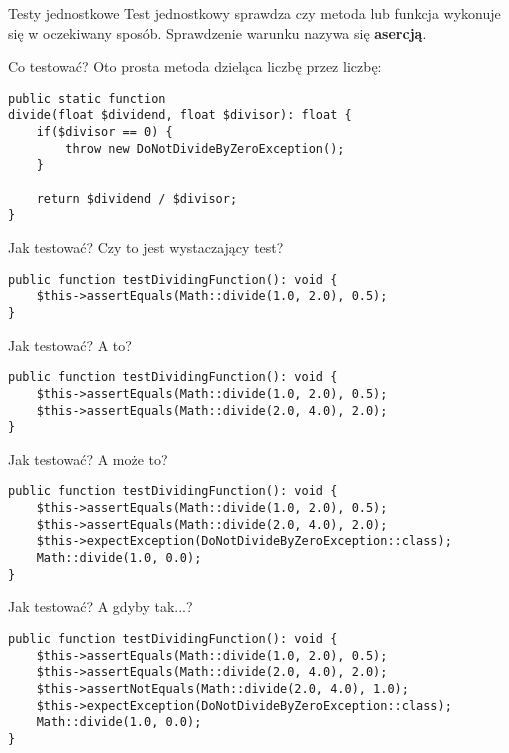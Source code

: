\begin{frame}{Testy jednostkowe}
	Test jednostkowy sprawdza czy metoda lub funkcja wykonuje się w oczekiwany sposób. Sprawdzenie warunku nazywa się \textbf{asercją}.
\end{frame}

\begin{frame}[fragile]{Co testować?}
	Oto prosta metoda dzieląca liczbę przez liczbę:

\begin{lstlisting}
public static function
divide(float $dividend, float $divisor): float {
    if($divisor == 0) {
        throw new DoNotDivideByZeroException();
    }
    
    return $dividend / $divisor;
}
\end{lstlisting}
\end{frame}

\begin{frame}[fragile]{Jak testować?}
	Czy to jest wystaczający test?

\begin{lstlisting}
public function testDividingFunction(): void {
    $this->assertEquals(Math::divide(1.0, 2.0), 0.5);
}
\end{lstlisting}
\end{frame}

\begin{frame}[fragile]{Jak testować?}
	A to?
	
\begin{lstlisting}
public function testDividingFunction(): void {
    $this->assertEquals(Math::divide(1.0, 2.0), 0.5);
    $this->assertEquals(Math::divide(2.0, 4.0), 2.0);
}
\end{lstlisting}
\end{frame}

\begin{frame}[fragile]{Jak testować?}
	A może to?
	
\begin{lstlisting}
public function testDividingFunction(): void {
    $this->assertEquals(Math::divide(1.0, 2.0), 0.5);
    $this->assertEquals(Math::divide(2.0, 4.0), 2.0);
    $this->expectException(DoNotDivideByZeroException::class);
    Math::divide(1.0, 0.0);
}
\end{lstlisting}
\end{frame}

\begin{frame}[fragile]{Jak testować?}
	A gdyby tak...?
	
\begin{lstlisting}
public function testDividingFunction(): void {
    $this->assertEquals(Math::divide(1.0, 2.0), 0.5);
    $this->assertEquals(Math::divide(2.0, 4.0), 2.0);
    $this->assertNotEquals(Math::divide(2.0, 4.0), 1.0);
    $this->expectException(DoNotDivideByZeroException::class);
    Math::divide(1.0, 0.0);
}
\end{lstlisting}
\end{frame}


